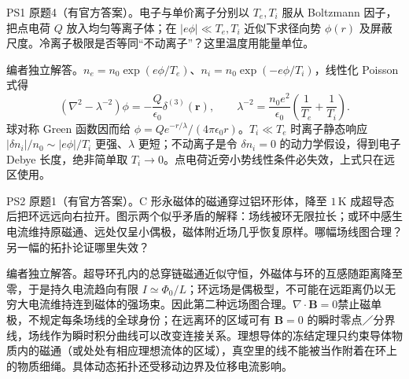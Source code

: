 \begin{exercise}\label{ex:hist02-1-4}
PS1 原题4（有官方答案）。电子与单价离子分别以 $T_e,T_i$ 服从 Boltzmann 因子，把点电荷 $Q$ 放入均匀等离子体；在 $|e\phi|\ll T_e,T_i$ 近似下求径向势 $\phi(r)$ 及屏蔽尺度。冷离子极限是否等同“不动离子”？这里温度用能量单位。
\end{exercise}
\begin{solution}
编者独立解答。$n_e=n_0\exp(e\phi/T_e)$、$n_i=n_0\exp(-e\phi/T_i)$，线性化 Poisson 式得
\begin{equation}(\nabla^2-\lambda^{-2})\phi=-\frac{Q}{\epsilon_0}\delta^{(3)}(\mathbf r),\qquad \lambda^{-2}=\frac{n_0e^2}{\epsilon_0}\left(\frac1{T_e}+\frac1{T_i}\right).
\end{equation}
球对称 Green 函数因而给 $\phi=Qe^{-r/\lambda}/(4\pi\epsilon_0r)$。$T_i\ll T_e$ 时离子静态响应 $|\delta n_i|/n_0\sim |e\phi|/T_i$ 更强、$\lambda$ 更短；不动离子是令 $\delta n_i=0$ 的动力学假设，得到电子 Debye 长度，绝非简单取 $T_i\to0$。点电荷近旁小势线性条件必失效，上式只在远区使用。
\end{solution}

\begin{exercise}\label{ex:hist02-2-1}
PS2 原题1（有官方答案）。C 形永磁体的磁通穿过铝环形体，降至 $1\,$K 成超导态后把环远远向右拉开。图示两个似乎矛盾的解释：场线被环无限拉长；或环中感生电流维持原磁通、远处仅呈小偶极，磁体附近场几乎恢复原样。哪幅场线图合理？另一幅的拓扑论证哪里失效？
\end{exercise}
\begin{solution}
编者独立解答。超导环孔内的总穿链磁通近似守恒，外磁体与环的互感随距离降至零，于是持久电流趋向有限 $I\simeq\Phi_0/L$；环远场是偶极型，不可能在远距离仍以无穷大电流维持连到磁体的强场束。因此第二种远场图合理。$\nabla\cdot\mathbf B=0$禁止磁单极，不规定每条场线的全球身份；在远离环的区域可有 $\mathbf B=0$ 的瞬时零点／分界线，场线作为瞬时积分曲线可以改变连接关系。理想导体的冻结定理只约束导体物质内的磁通（或处处有相应理想流体的区域），真空里的线不能被当作附着在环上的物质细绳。具体动态拓扑还受移动边界及位移电流影响。
\end{solution}

